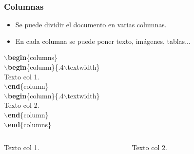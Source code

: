 \documentclass[aspectratio=43]{beamer}%
\begin{document}
\begin{frame}[fragile]
\frametitle{\textbf{Columnas}}
\justifying
 \begin{itemize}\justifying
  \item Se puede dividir el documento en varias columnas.
  \item En cada columna se puede poner texto, imágenes, tablas...
\end{itemize}

\begin{minipage}[l]{0.4\linewidth}


$\backslash$\textbf{begin}\{columns\} \\
$\backslash$\textbf{begin}\{column\}\{.4$\backslash$textwidth\} \\
Texto col 1.\\
$\backslash$\textbf{end}\{column\} \\
$\backslash$\textbf{begin}\{column\}\{.4$\backslash$textwidth\} \\
Texto col 2.\\
$\backslash$\textbf{end}\{column\}\\
$\backslash$\textbf{end}\{columns\}

\end{minipage}\hfill
\begin{minipage}[r]{0.58\linewidth}
\begin{columns} 
\begin{column}{.4\textwidth} 
Texto col 1.
\end{column} 
\begin{column}{.4\textwidth} 
Texto col 2.
\end{column}
\end{columns}
\end{minipage}

\end{frame}
\end{document}
